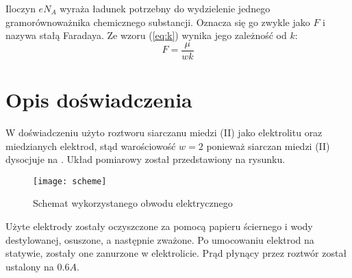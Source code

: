 \documentclass[a4paper,10pt,twoside]{article}
\begin{document}
Iloczyn $eN_A$ wyraża ładunek potrzebny do wydzielenie jednego gramorównoważnika chemicznego substancji. Oznacza się go zwykle jako $F$ i nazywa stałą Faradaya.
Ze wzoru (\ref{eq:k}) wynika jego zależność od $k$:
\begin{equation}
F=\frac{\mu}{wk}
\end{equation}

\newpage
\section{Opis doświadczenia}
W doświadczeniu użyto roztworu siarczanu miedzi (II)  jako elektrolitu oraz miedzianych elektrod, stąd warościowość $w=2$ ponieważ siarczan miedzi (II)
dysocjuje na . Układ pomiarowy został przedstawiony na rysunku.
\begin{figure}[!htb]
\centerline{\texttt{[image: scheme]}}
\caption{Schemat wykorzystanego obwodu elektrycznego}
\end{figure}
Użyte elektrody zostały oczyszczone za pomocą papieru ściernego i wody destylowanej, osuszone, a następnie zważone. Po umocowaniu elektrod na statywie, zostały one
zanurzone w elektrolicie. Prąd płynący przez roztwór został ustalony na $0.6A$.
\end{document}
